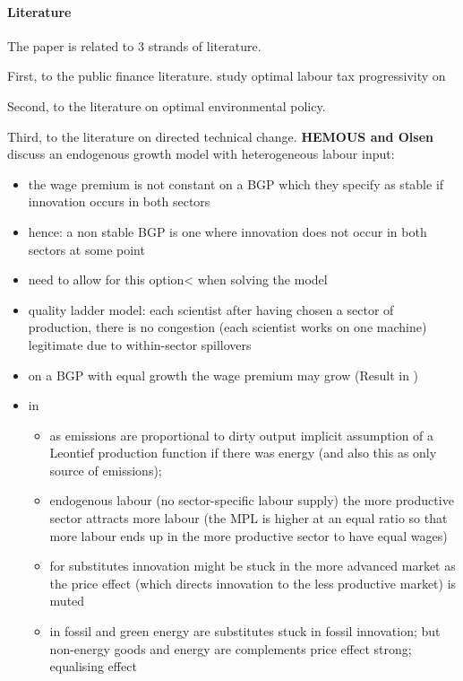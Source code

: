 \paragraph{Literature}

The paper is related to 3 strands of literature. 

First, to the public finance literature.  \cite{Heathcote2017OptimalFramework} study optimal labour tax progressivity on 



Second, to the literature on optimal environmental policy. 

Third, to the literature on directed technical change. 
\textbf{HEMOUS and Olsen} discuss an endogenous growth model with heterogeneous labour input:
\begin{itemize}
	\item the wage premium is not constant on a BGP which they specify as stable if innovation occurs in both sectors
	\item hence: a non stable BGP is one where innovation does not occur in both sectors at some point
	\item need to allow for this option< when solving the model
	\item quality ladder model: each scientist after having chosen a sector of production, there is no congestion (each scientist works on one machine) legitimate due to within-sector spillovers
	\item on a BGP with equal growth the wage premium may grow (Result in \cite{Acemoglu2002DirectedChange}) 
	\item in \cite{Acemoglu2012TheChange} 
	\begin{itemize}
		\item as emissions are proportional to dirty output implicit assumption of a Leontief production function if there was energy (and also this as only source of emissions); 
		 \item endogenous labour (no sector-specific labour supply) \ar the more productive sector attracts more labour (the MPL is higher at an equal ratio so that more labour ends up in the more productive sector to have equal wages)
		 \item for substitutes innovation might be stuck in the more advanced market as the price effect (which directs innovation to the less productive market) is muted
		 \item[\ar] in \cite{Fried2018ClimateAnalysis} fossil and green energy are substitutes \ar stuck in fossil innovation; but non-energy goods and energy are complements \ar price effect strong; equalising effect

\end{itemize}
\end{itemize}
